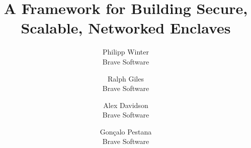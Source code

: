 \documentclass[letterpaper,twocolumn,10pt]{article}
\begin{document}
\title{A Framework for Building Secure, Scalable, Networked Enclaves}

\author{
  {\rm Philipp Winter} \\
  Brave Software
  \and
  {\rm Ralph Giles} \\
  Brave Software
  \and
  {\rm Alex Davidson} \\
  Brave Software
  \and
  {\rm Gonçalo Pestana} \\
  Brave Software
}

\maketitle











\balance
\printbibliography
\end{document}
